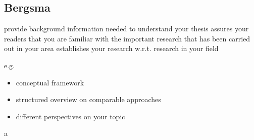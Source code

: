 \subsection{Bergsma}


provide background information needed to understand your thesis
assures your readers that you are familiar with the important research that has been carried out in your area
establishes your research w.r.t. research in your field

e.g.\
\begin{itemize}
  \item conceptual framework
  \item structured overview on comparable approaches
  \item different perspectives on your topic
\end{itemize}

 a